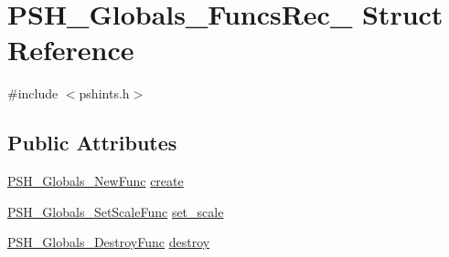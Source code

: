 \hypertarget{struct_p_s_h___globals___funcs_rec__}{\section{P\-S\-H\-\_\-\-Globals\-\_\-\-Funcs\-Rec\-\_\- Struct Reference}
\label{struct_p_s_h___globals___funcs_rec__}
}


{\ttfamily \#include $<$pshints.\-h$>$}

\subsection*{Public Attributes}
\begin{DoxyCompactItemize}
\item 
\hyperlink{pshints_8h_afd0042b9254abe050df32974e4c68436}{P\-S\-H\-\_\-\-Globals\-\_\-\-New\-Func} \hyperlink{struct_p_s_h___globals___funcs_rec___ac136cec55ea33a2e3b60ffdad20f5420}{create}
\item 
\hyperlink{pshints_8h_a1c844127c9b5813d6f063f48e7009e7c}{P\-S\-H\-\_\-\-Globals\-\_\-\-Set\-Scale\-Func} \hyperlink{struct_p_s_h___globals___funcs_rec___a9c97456d3f521cb1091f08c2bda27332}{set\-\_\-scale}
\item 
\hyperlink{pshints_8h_ae26d3a2bd4ecf648c4d9f1ee78173f86}{P\-S\-H\-\_\-\-Globals\-\_\-\-Destroy\-Func} \hyperlink{struct_p_s_h___globals___funcs_rec___aebb5534f8305a189b09adfebff4f57ba}{destroy}
\end{DoxyCompactItemize}


